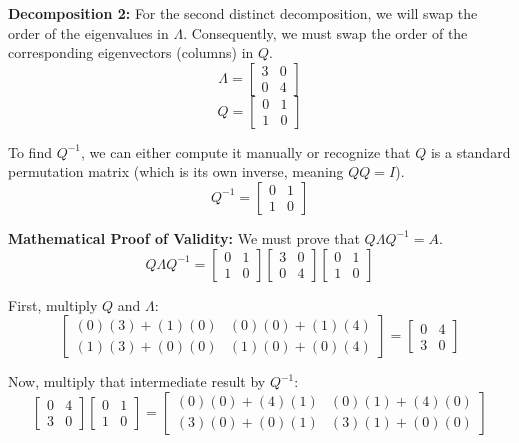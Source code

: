 \documentclass[twoside, 10pt]{article}
\begin{document}
\textbf{Decomposition 2:} For the second distinct decomposition, we will swap the order of the eigenvalues in $\Lambda$. Consequently, we must swap the order of the corresponding eigenvectors (columns) in $Q$.
\[ \Lambda = \begin{bmatrix} 3 & 0 \\ 0 & 4 \end{bmatrix} \]
\[ Q = \begin{bmatrix} 0 & 1 \\ 1 & 0 \end{bmatrix} \]

To find $Q^{-1}$, we can either compute it manually or recognize that $Q$ is a standard permutation matrix (which is its own inverse, meaning $Q Q = I$).
\[ Q^{-1} = \begin{bmatrix} 0 & 1 \\ 1 & 0 \end{bmatrix} \]

\textbf{Mathematical Proof of Validity:} We must prove that $Q \Lambda Q^{-1} = A$.
\[ Q \Lambda Q^{-1} = \begin{bmatrix} 0 & 1 \\ 1 & 0 \end{bmatrix} \begin{bmatrix} 3 & 0 \\ 0 & 4 \end{bmatrix} \begin{bmatrix} 0 & 1 \\ 1 & 0 \end{bmatrix} \]

First, multiply $Q$ and $\Lambda$:
\[ \begin{bmatrix} (0)(3) + (1)(0) & (0)(0) + (1)(4) \\ (1)(3) + (0)(0) & (1)(0) + (0)(4) \end{bmatrix} = \begin{bmatrix} 0 & 4 \\ 3 & 0 \end{bmatrix} \]

Now, multiply that intermediate result by $Q^{-1}$:
\[ \begin{bmatrix} 0 & 4 \\ 3 & 0 \end{bmatrix} \begin{bmatrix} 0 & 1 \\ 1 & 0 \end{bmatrix} = \begin{bmatrix} (0)(0) + (4)(1) & (0)(1) + (4)(0) \\ (3)(0) + (0)(1) & (3)(1) + (0)(0) \end{bmatrix} \]
\end{document}

